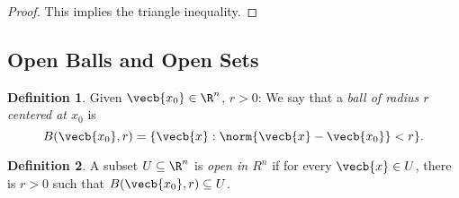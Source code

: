 \documentclass[a5paper]{article}
\theoremstyle{definition}%
\newtheorem*{definition*}{Definition}
\numberwithin{exercise}{section}
\theoremstyle{remark}%
\begin{document}
\begin{proof}
This implies the triangle inequality. 
\end{proof}

\subsection{Open Balls and Open Sets}
\begin{highlight}
\begin{definition*}
Given $\vecb{x_0}\in\R^n$, $r>0$: We say that a \emph{ball of radius $r$ centered at $x_0$} is 
$$B(\vecb{x_0}, r)=\{\vecb{x}:\norm{\vecb{x}-\vecb{x_0}}<r\}.$$
\end{definition*}
\end{highlight}

\begin{highlight}
\begin{definition*}
A subset $U\subseteq \R^n$ is \emph{open in $R^n$} if for every $\vecb{x}\in U$, there is $r>0$ such that $B(\vecb{x_0}, r) \subseteq U $. 
\end{definition*}
\end{highlight}
\end{document}
